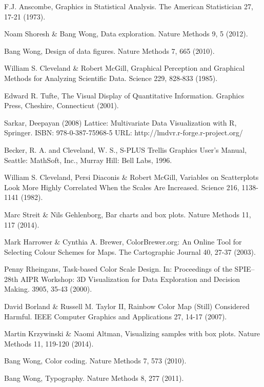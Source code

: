 \documentclass[letterpaper]{report}\usepackage[]{graphicx}\usepackage[]{color}
\begin{document}
\begin{thebibliography}{1}
F.J. Anscombe, Graphics in Statistical Analysis. The American Statistician 27, 17-21 (1973).

Noam Shoresh \& Bang Wong, Data exploration. Nature Methods 9, 5 (2012).

Bang Wong, Design of data figures. Nature Methods 7, 665 (2010).

William S. Cleveland \& Robert McGill, Graphical Perception and Graphical Methods for Analyzing Scientific Data. Science 229, 828-833 (1985).

Edward R. Tufte, The Visual Display of Quantitative Information. Graphics Press, Cheshire, Connecticut (2001).

Sarkar, Deepayan (2008) Lattice: Multivariate Data Visualization with R, Springer.  ISBN: 978-0-387-75968-5 URL: http://lmdvr.r-forge.r-project.org/

Becker, R. A. and Cleveland, W. S., S-PLUS Trellis Graphics User's Manual, Seattle: MathSoft, Inc., Murray Hill: Bell Labs, 1996.

William S. Cleveland, Persi Diaconis \& Robert McGill, Variables on Scatterplots Look More Highly Correlated When the Scales Are Increased. Science 216, 1138-1141 (1982).

Marc Streit \& Nils Gehlenborg, Bar charts and box plots. Nature Methods 11, 117 (2014).

Mark Harrower \& Cynthia A. Brewer, ColorBrewer.org: An Online Tool for Selecting Colour Schemes for Maps. The Cartographic Journal 40, 27-37 (2003).

Penny Rheingans, Task-based Color Scale Design. In: Proceedings of the SPIE--28th AIPR Workshop: 3D Visualization for Data Exploration and Decision Making. 3905, 35-43 (2000).

David Borland \& Russell M. Taylor II, Rainbow Color Map (Still) Considered Harmful. IEEE Computer Graphics and Applications 27, 14-17 (2007).

Martin Krzywinski \& Naomi Altman, Visualizing samples with box plots. Nature Methods 11, 119-120 (2014).

Bang Wong, Color coding. Nature Methods 7, 573 (2010).

Bang Wong, Typography. Nature Methods 8, 277 (2011).


\end{thebibliography}
\end{document}

